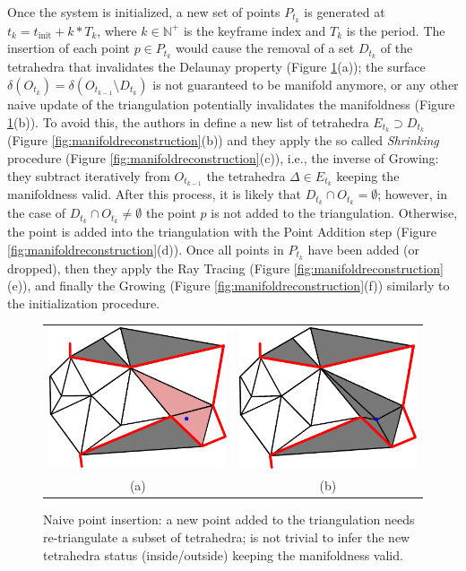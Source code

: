 Once the system is initialized, a new set of points $P_{t_k}$ is generated at $t_k= t_{\text{init}} + k*T_k$, where $k \in \mathbb{N^+}$ is the keyframe index and $T_k$ is the period. 
The insertion of each point $p\in P_{t_k}$ would cause the removal of a set $D_{t_k}$ of the tetrahedra that invalidates the Delaunay property (Figure \ref{fig:insertion}(a)); the surface $\delta (O_{t_k}) = \delta (O_{t_{k-1}} \setminus D_{t_k})$ is not guaranteed to be manifold anymore, or any other naive update of the triangulation potentially invalidates the manifoldness (Figure \ref{fig:insertion}(b)). 
To avoid this, the authors in \cite{litvinov_lhuillier_13} define a new list of tetrahedra $E_{t_k} \supset D_{t_k}$ (Figure \ref{fig:manifoldreconstruction}(b)) and they apply the so called \emph{Shrinking} procedure (Figure \ref{fig:manifoldreconstruction}(c)), i.e., the inverse of Growing: they subtract iteratively from $O_{t_{k-1}}$ the tetrahedra  $\Delta \in E_{t_k}$ keeping the manifoldness valid.
After this process, it is likely that $D_{t_k} \cap O_{t_k} = \emptyset$; however, in the case of $D_{t_k} \cap O_{t_k} \neq \emptyset$ the point $p$ is not added to the triangulation.
Otherwise, the point is added into the triangulation with the Point Addition step (Figure \ref{fig:manifoldreconstruction}(d)). 
Once all points in $P_{t_k}$ have been added (or dropped), then they apply the Ray Tracing  (Figure \ref{fig:manifoldreconstruction}(e)), and finally the Growing (Figure \ref{fig:manifoldreconstruction}(f)) similarly to the initialization procedure.


\begin{figure}[tp]
\centering
 \begin{tabular}{cc}
  \includegraphics[width=0.45\columnwidth]{./img/ch_soa/pointIns01}&
  \includegraphics[width=0.45\columnwidth]{./img/ch_soa/pointIns02}\\
  (a)&(b)
 \end{tabular}
 \caption{Naive point insertion: a new point added to the triangulation needs re-triangulate a subset of tetrahedra; is not trivial to infer the new tetrahedra status (inside/outside) keeping the manifoldness valid.}
 \label{fig:insertion}
\end{figure}



